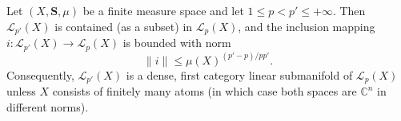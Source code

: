 Let $(X, \mathbf{S}, \mu)$ be a finite measure space and let $1 \leq p < p' \leq +\infty$. Then $\mathcal{L}_{p'}(X)$ is contained (as a subset) in $\mathcal{L}_p(X)$, and the inclusion mapping $i: \mathcal{L}_{p'}(X) \to \mathcal{L}_p(X)$ is bounded with norm
$$\|i\| \leq \mu(X)^{(p' - p)/pp'}.$$
Consequently, $\mathcal{L}_{p'}(X)$ is a dense, first category linear submanifold of $\mathcal{L}_p(X)$ unless $X$ consists of finitely many atoms (in which case both spaces are $\mathbb{C}^n$ in different norms).
